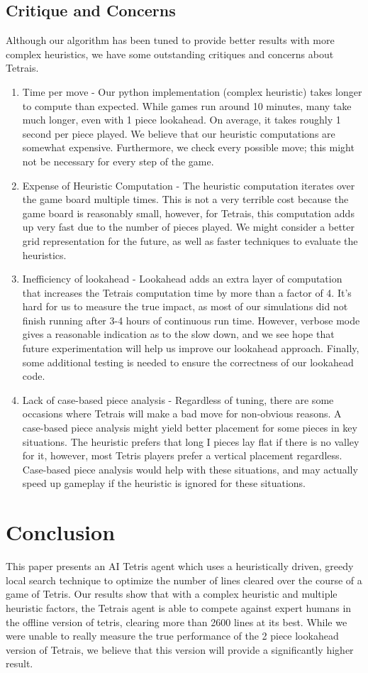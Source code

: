 \documentclass[11pt]{article}
\begin{document}
\subsection{Critique and Concerns}
Although our algorithm has been tuned to provide better results with more complex heuristics, we have some outstanding critiques and concerns about Tetrais.
\begin{enumerate}
\item Time per move - Our python implementation (complex heuristic) takes longer to compute than expected. While games run around 10 minutes, many take much longer, even with 1 piece lookahead. On average, it takes roughly 1 second per piece played. We believe that our heuristic computations are somewhat expensive. Furthermore, we check every possible move; this might not be necessary for every step of the game.
\item Expense of Heuristic Computation - The heuristic computation iterates over the game board multiple times. This is not a very terrible cost because the game board is reasonably small, however, for Tetrais, this computation adds up very fast due to the number of pieces played. We might consider a better grid representation for the future, as well as faster techniques to evaluate the heuristics.
\item Inefficiency of lookahead - Lookahead adds an extra layer of computation that increases the Tetrais computation time by more than a factor of 4. It’s hard for us to measure the true impact, as most of our simulations did not finish running after 3-4 hours of continuous run time. However, verbose mode gives a reasonable indication as to the slow down, and we see hope that future experimentation will help us improve our lookahead approach. Finally, some additional testing is needed to ensure the correctness of our lookahead code.
\item Lack of case-based piece analysis - Regardless of tuning, there are some occasions where Tetrais will make a bad move for non-obvious reasons. A case-based piece analysis might yield better placement for some pieces in key situations. The heuristic prefers that long I pieces lay flat if there is no valley for it, however, most Tetris players prefer a vertical placement regardless. Case-based piece analysis would help with these situations, and may actually speed up gameplay if the heuristic is ignored for these situations.
\end{enumerate}

\section{Conclusion}
This paper presents an AI Tetris agent which uses a heuristically driven, greedy local search technique to optimize the number of lines cleared over the course of a game of Tetris. Our results show that with a complex heuristic and multiple heuristic factors, the Tetrais agent is able to compete against expert humans in the offline version of tetris, clearing more than 2600 lines at its best. While we were unable to really measure the true performance of the 2 piece lookahead version of Tetrais, we believe that this version will provide a significantly higher result. 
\end{document}
